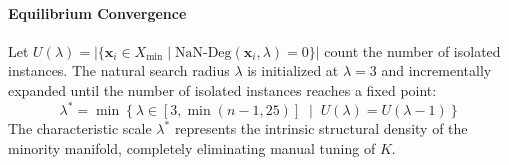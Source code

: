 \documentclass[sn-basic]{sn-jnl}
\begin{document}
\paragraph{Equilibrium Convergence} Let $U(\lambda) = |\{\mathbf{x}_i \in X_{\min} \mid \text{NaN-Deg}(\mathbf{x}_i, \lambda) = 0\}|$ count the number of isolated instances. The natural search radius $\lambda$ is initialized at $\lambda=3$ and incrementally expanded until the number of isolated instances reaches a fixed point:
\begin{equation}
\label{eq:equilibrium}
\lambda^* = \min \left\{ \lambda \in [3, \min(n-1, 25)] \;\middle|\; U(\lambda) = U(\lambda - 1) \right\}
\end{equation}
The characteristic scale $\lambda^*$ represents the intrinsic structural density of the minority manifold, completely eliminating manual tuning of $K$.
\end{document}
